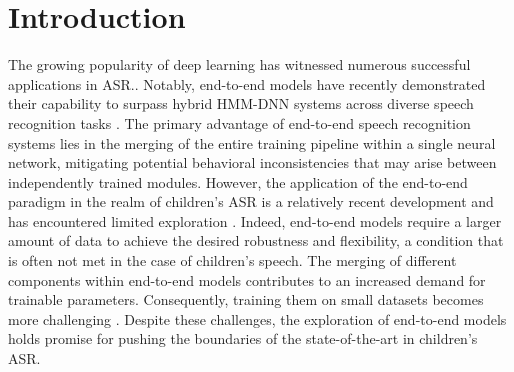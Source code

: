 \label{chap:4}
\cleardoublepage
\section{Introduction}
\label{chap:implement}
The growing popularity of deep learning has witnessed numerous successful applications in ASR.. Notably, end-to-end models have recently demonstrated their capability to surpass hybrid HMM-DNN systems across diverse speech recognition tasks \cite{zeyer2019comparison,zeineldeen2022conformer}. The primary advantage of end-to-end speech recognition systems lies in the merging of the entire training pipeline within a single neural network, mitigating potential behavioral inconsistencies that may arise between independently trained modules.
However, the application of the end-to-end paradigm in the realm of children's ASR is a relatively recent development and has encountered limited exploration \cite{gelin2021endtoend,sri_end2end,chen2020data,ng2020cuhk}. Indeed, end-to-end models require a larger amount of data to achieve the desired robustness and flexibility, a condition that is often not met in the case of children's speech. The merging of different components within end-to-end models contributes to an increased demand for trainable parameters. Consequently, training them on small datasets becomes more challenging \cite{luscher2019rwth}. Despite these challenges, the exploration of end-to-end models holds promise for pushing the boundaries of the state-of-the-art in children's ASR.



